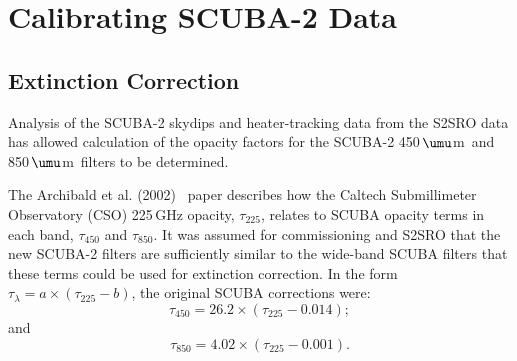 \documentclass[twoside,11pt]{article}
\newcommand{\micron}{\mbox{\,${\umu}$m}}            %
\newcommand{\xlabel}[1]{}
\renewcommand{\_}{\texttt{\symbol{95}}}
\begin{document}
\begin{description}


\end{description}

\section{\xlabel{calib}Calibrating SCUBA-2 Data}
\label{sec:calib}

\subsection{Extinction Correction}

Analysis of the SCUBA-2 skydips and heater-tracking data from the
S2SRO data has allowed calculation of the opacity factors for the
SCUBA-2 450\micron\ and 850\micron\ filters to be determined.

The Archibald et al. (2002)~\cite{archibald} paper describes how the
Caltech Submillimeter Observatory (CSO) 225\,GHz opacity,
$\tau_{225}$, relates to SCUBA opacity terms in each band,
$\tau_{450}$ and $\tau_{850}$. It was assumed for commissioning and
S2SRO that the new SCUBA-2 filters are sufficiently similar to the
wide-band SCUBA filters that these terms could be used for extinction
correction. In the form $\tau_{\lambda} = a \times (\tau_{225} - b)$,
the original SCUBA corrections were:
\begin{equation}
\tau_{450} = 26.2 \times (\tau_{225} - 0.014);
\end{equation}
and
\begin{equation}
\tau_{850} = 4.02 \times (\tau_{225} - 0.001).
\end{equation}
\end{document}
